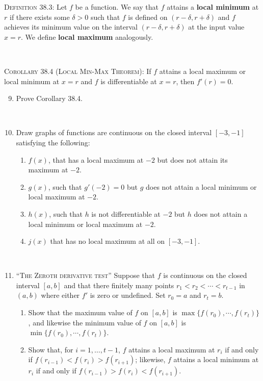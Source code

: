 \documentclass[12pt]{amsart}
\begin{document}
\newpage


\begin{framed} 
 \noindent \noindent \textsc{Definition 38.3:} Let $f$ be a function. We say that $f$ attains a \textbf{local minimum} at $r$ if there exists some $\delta>0$ such that $f$ is defined on $(r-\delta,r+\delta)$ and $f$ achieves its minimum value on the interval $(r-\delta,r+\delta)$ at the input value $x=r$. We define \textbf{local maximum} analogously. 
 
 \
 
   \noindent \textsc{Corollary 38.4 (Local Min-Max Theorem):} If $f$ attains a local maximum or local minimum at $x=r$ and $f$ is differentiable at $x=r$, then $f'(r)=0$. 
 \end{framed}



\begin{enumerate}
\setcounter{enumi}{8}
\item Prove Corollary 38.4.

\

\item Draw graphs of functions are continuous on the closed interval $[-3,-1]$ satisfying the following:
\begin{enumerate}
\item  $f(x)$, that has a local maximum at $-2$ but does not attain its maximum at $-2$.
\item  $g(x)$, such that $g'(-2)=0$ but $g$ does not attain a local minimum or local maximum at $-2$.
\item $h(x)$, such that $h$ is not differentiable at $-2$ but $h$ does not attain a local minimum or local maximum at $-2$.
\item $j(x)$ that has no local maximum at all on $[-3,-1]$.
\end{enumerate}

\

\item \textsc{``The Zeroth derivative test''} Suppose that $f$ is continuous on the closed interval $[a,b]$ and that there finitely many points $r_1 < r_2 < \cdots <r_{t-1}$ in $(a,b)$ where either $f'$ is zero or undefined. Set $r_0=a$ and $r_t=b$.
\begin{enumerate}
\item Show that the maximum value of $f$ on $[a,b]$ is $\max\{ f(r_0) , \cdots, f(r_t)\}$, and likewise the minimum value of $f$ on $[a,b]$ is $\min\{ f(r_0) , \cdots, f(r_t)\}$.
\item Show that, for $i=1,\dots,t-1$, $f$ attains a local maximum at $r_i$ if and only if $f(r_{i-1}) < f(r_i) > f(r_{i+1})$; likewise, $f$ attains a local minimum at $r_i$ if and only if $f(r_{i-1}) > f(r_i) < f(r_{i+1})$.
\end{enumerate}


\end{enumerate}
\end{document}
